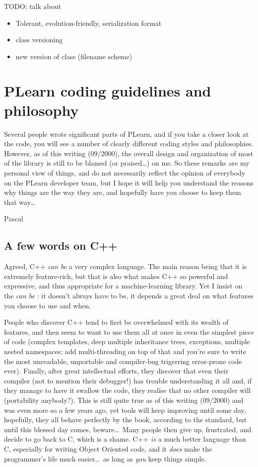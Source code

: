 \documentclass[11pt]{book}
\begin{document}
TODO: talk about 
\begin{itemize}
\item Tolerant, evolution-friendly, serialization format
\item class versioning
\item new version of class (filename scheme)
\end{itemize}



\chapter{ PLearn coding guidelines and philosophy}

 Several people wrote significant parts of PLearn, and if you take a
closer look at the code, you will see a number of clearly different
coding styles and philosophies. However, as of this writing (09/2000),
the overall design and organization of most of the library is still to
be blamed (or praised\ldots) on me. So these remarks are my personal
view of things, and do not necessarily reflect the opinion of everybody
on the PLearn developer team, but I hope it will help you understand
the reasons why things are the way they are, and hopefully have you
choose to keep them that way\ldots

 Pascal 

\section{A few words on C++}
 Agreed, C++ \emph{can be} a very complex language. The main reason
being that it is extremely feature-rich, but that is also what
makes C++ so powerful and expressive, and thus appropriate for a
machine-learning library. Yet I insist on the \emph{can be} : it
doesn't always have to be, it depends a great deal on what features
you choose to use and when.

People who discover C++ tend to first be overwhelmed with its wealth
of features, and then seem to want to use them all at once in even the
simplest piece of code (complex templates, deep multiple inheritance
trees, exceptions, multiple nested namespaces; add multi-threading on
top of that and you're sure to write the most unreadable, unportable
and compiler-bug trigerring error-prone code ever). Finally, after
great intellectual efforts, they discover that even their compiler
(not to mention their debugger!) has trouble understanding it all
and, if they manage to have it swallow the code, they realise that
no other compiler will (portability anybody?). This is still quite
true as of this writing (09/2000) and was even more so a few years
ago, yet tools will keep improving until some day, hopefully, they
all behave perfectly by the book, according to the standard, but
until this blessed day comes, beware\ldots\ Many people then give up,
frustrated, and decide to go back to C, which is a shame. C++ \emph{is}
a much better language than C, especially for writing Object Oriented
code, and it \emph{does} make the programmer's life much easier\ldots\
as long as \emph{you} keep things simple.
\end{document}
